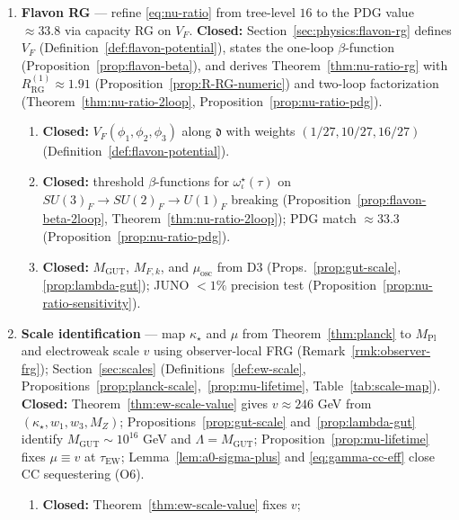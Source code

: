 \documentclass[11pt]{article}
\theoremstyle{plain}
\theoremstyle{definition}
\theoremstyle{remark}
\numberwithin{equation}{section}
\newcommand{\MPl}{M_{\mathrm{Pl}}}
\begin{document}
\begin{enumerate}[label=\textbf{D\arabic*.},leftmargin=*]
  \item \textbf{Flavon RG} --- refine \eqref{eq:nu-ratio} from tree-level
    $16$ to the PDG value $\approx 33.8$ via capacity RG on $V_F$.
    \textbf{Closed:} Section~\ref{sec:physics:flavon-rg} defines
    $V_F$ (Definition~\ref{def:flavon-potential}), states the one-loop
    $\beta$-function (Proposition~\ref{prop:flavon-beta}), and derives
    Theorem~\ref{thm:nu-ratio-rg} with $R_{\mathrm{RG}}^{(1)}\approx 1.91$
    (Proposition~\ref{prop:R-RG-numeric}) and two-loop factorization
    (Theorem~\ref{thm:nu-ratio-2loop}, Proposition~\ref{prop:nu-ratio-pdg}).
    \begin{enumerate}[label=\textit{D2.\alph*.},leftmargin=2em]
      \item \textbf{Closed:} $V_F(\phi_1,\phi_2,\phi_3)$ along
        $\mathfrak{d}$ with weights $(1/27,10/27,16/27)$
        (Definition~\ref{def:flavon-potential}).
      \item \textbf{Closed:} threshold $\beta$-functions for
        $\omega^\star_\iota(\tau)$ on $SU(3)_F\to SU(2)_F\to U(1)_F$
        breaking (Proposition~\ref{prop:flavon-beta-2loop},
        Theorem~\ref{thm:nu-ratio-2loop}); PDG match
        $\approx 33.3$ (Proposition~\ref{prop:nu-ratio-pdg}).
      \item \textbf{Closed:} $M_{\mathrm{GUT}}$, $M_{F,k}$, and
        $\mu_{\mathrm{osc}}$ from D3 (Props.~\ref{prop:gut-scale},
        \ref{prop:lambda-gut}); JUNO $<1\%$ precision test
        (Proposition~\ref{prop:nu-ratio-sensitivity}).
    \end{enumerate}
  \item \textbf{Scale identification} --- map $\kappa_\star$ and $\mu$ from
    Theorem~\ref{thm:planck} to $\MPl$ and electroweak scale $v$ using
    observer-local FRG (Remark~\ref{rmk:observer-frg});
    Section~\ref{sec:scales} (Definitions~\ref{def:ew-scale},
    Propositions~\ref{prop:planck-scale},~\ref{prop:mu-lifetime},
    Table~\ref{tab:scale-map}).
    \textbf{Closed:} Theorem~\ref{thm:ew-scale-value} gives
    $v\approx 246$ GeV from $(\kappa_\star,w_1,w_3,M_Z)$;
    Propositions~\ref{prop:gut-scale} and~\ref{prop:lambda-gut} identify
    $M_{\mathrm{GUT}}\sim 10^{16}$ GeV and $\Lambda=M_{\mathrm{GUT}}$;
    Proposition~\ref{prop:mu-lifetime} fixes $\mu\equiv v$ at
    $\tau_{\mathrm{EW}}$; Lemma~\ref{lem:a0-sigma-plus} and
    \eqref{eq:gamma-cc-eff} close CC sequestering (O6).
    \begin{enumerate}[label=\textit{D3.\alph*.},leftmargin=2em]
      \item \textbf{Closed:} Theorem~\ref{thm:ew-scale-value} fixes $v$;

\end{enumerate}
\end{enumerate}
\end{document}

